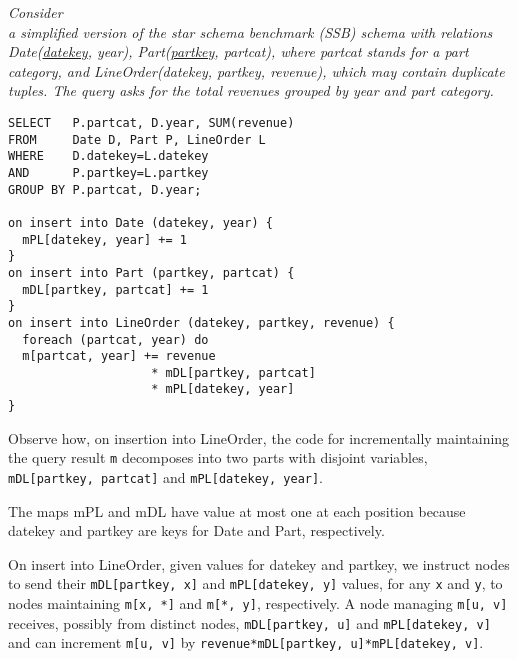 \begin{example}\em
\label{ex:ssb}
Con\-sider \\ a simplified version of the star schema
benchmark (SSB) schema with relations Date(\underline{datekey}, year),
Part(\underline{partkey}, partcat), where partcat stands for a part category,
and LineOrder(datekey, partkey, revenue), which may contain duplicate tuples.
The query asks for the total revenues grouped by year and part category.

\begin{verbatim}
SELECT   P.partcat, D.year, SUM(revenue)
FROM     Date D, Part P, LineOrder L
WHERE    D.datekey=L.datekey
AND      P.partkey=L.partkey
GROUP BY P.partcat, D.year;

on insert into Date (datekey, year) {
  mPL[datekey, year] += 1
}
on insert into Part (partkey, partcat) {
  mDL[partkey, partcat] += 1
}
on insert into LineOrder (datekey, partkey, revenue) {
  foreach (partcat, year) do
  m[partcat, year] += revenue
                    * mDL[partkey, partcat]
                    * mPL[datekey, year]
}
\end{verbatim}

Observe how, on insertion into LineOrder, the code for incrementally
maintaining the query result {\tt m} decomposes into
two parts with disjoint variables, 
{\tt mDL[partkey, partcat]} and {\tt mPL[datekey, year]}.

The maps mPL and mDL have value at most
one at each position because datekey and partkey are keys for Date and Part,
respectively.

On insert into LineOrder, given values for
datekey and partkey, we instruct nodes
to send their {\tt mDL[partkey, x]} and {\tt mPL[datekey, y]} values,
for any {\tt x} and {\tt y},
to nodes maintaining {\tt m[x, *]} and {\tt m[*, y]}, respectively.
A node managing {\tt m[u, v]} receives, possibly from distinct nodes,
{\tt mDL[partkey, u]} and {\tt mPL[datekey, v]}
and can increment {\tt m[u, v]} by
{\tt revenue*mDL[partkey, u]*mPL[datekey, v]}.
%
\punto
\end{example}


